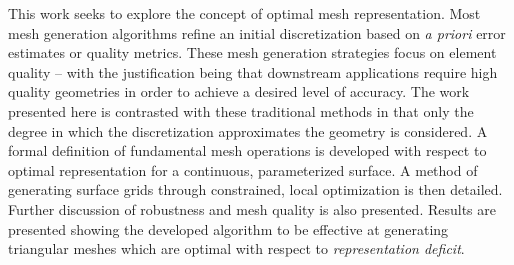 This work seeks to explore the concept of optimal mesh representation. Most mesh generation algorithms refine an initial discretization based on {\it a priori} error estimates or quality metrics. These mesh generation strategies focus on element quality -- with the justification being that downstream applications require high quality geometries in order to achieve a desired level of accuracy. The work presented here is contrasted with these traditional methods in that only the degree in which the discretization approximates the geometry is considered. A formal definition of fundamental mesh operations is developed with respect to optimal representation for a continuous, parameterized surface. A method of generating surface grids through constrained, local optimization is then detailed. Further discussion of robustness and mesh quality is also presented. Results are presented showing the developed algorithm to be effective at generating triangular meshes which are optimal with respect to {\it representation deficit}.
